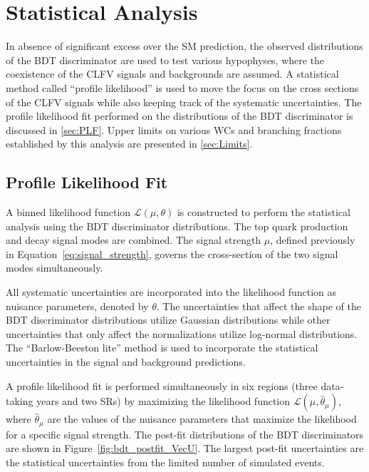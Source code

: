 \chapter{Statistical Analysis}
\label{chap:Results}

In absence of significant excess over the \ac{SM} prediction, the observed distributions of the \ac{BDT} discriminator are used to test various hypophyses, where the coexistence of the \ac{CLFV} signals and backgrounds are assumed. A statistical method called ``profile likelihood'' is used to move the focus on the cross sections of the \ac{CLFV} signals while also keeping track of the systematic uncertainties. The profile likelihood fit performed on the distributions of the \ac{BDT} discriminator is discussed in \autoref{sec:PLF}. Upper limits on various \acp{WC} and branching fractions established by this analysis are presented in \autoref{sec:Limits}. 

\section{Profile Likelihood Fit}
\label{sec:PLF}

A binned likelihood function $\mathcal{L}(\mu, \theta)$ is constructed to perform the statistical analysis using the \ac{BDT} discriminator distributions. The top quark production and decay signal modes are combined. The signal strength $\mu$, defined previously in Equation~\ref{eq:signal_strength}, governs the cross-section of the two signal modes simultaneously. 

All systematic uncertainties are incorporated into the likelihood function as nuisance parameters, denoted by $\theta$. The uncertainties that affect the shape of the \ac{BDT} discriminator distributions utilize Gaussian distributions while other uncertainties that only affect the normalizations utilize log-normal distributions. The ``Barlow-Beeston lite'' method \cite{Barlow:1993dm} is used to incorporate the statistical uncertainties in the signal and background predictions. 

A profile likelihood fit is performed simultaneously in six regions (three data-taking years and two \acp{SR}) by maximizing the likelihood function $\mathcal{L}(\mu, \hat{\theta}_{\mu})$, where $\hat{\theta}_{\mu}$ are the values of the nuisance parameters that maximize the likelihood for a specific signal strength. The post-fit distributions of the \ac{BDT} discriminators are shown in Figure~\ref{fig:bdt_postfit_VecU}. The largest post-fit uncertainties are the statistical uncertainties from the limited number of simulated events.

